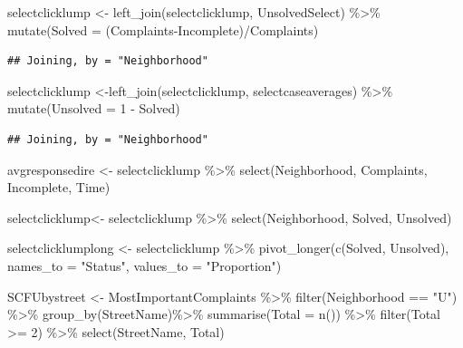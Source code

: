 \documentclass[
]{article}
\newenvironment{Shaded}{\begin{snugshade}}{\end{snugshade}}
\newcommand{\AttributeTok}[1]{\textcolor[rgb]{0.77,0.63,0.00}{#1}}
\newcommand{\DecValTok}[1]{\textcolor[rgb]{0.00,0.00,0.81}{#1}}
\newcommand{\FunctionTok}[1]{\textcolor[rgb]{0.00,0.00,0.00}{#1}}
\newcommand{\NormalTok}[1]{#1}
\newcommand{\OtherTok}[1]{\textcolor[rgb]{0.56,0.35,0.01}{#1}}
\newcommand{\SpecialCharTok}[1]{\textcolor[rgb]{0.00,0.00,0.00}{#1}}
\newcommand{\StringTok}[1]{\textcolor[rgb]{0.31,0.60,0.02}{#1}}
\begin{document}
\begin{Shaded}
\begin{Highlighting}[]
\NormalTok{selectclicklump }\OtherTok{\textless{}{-}} \FunctionTok{left\_join}\NormalTok{(selectclicklump, UnsolvedSelect) }\SpecialCharTok{\%\textgreater{}\%}
  \FunctionTok{mutate}\NormalTok{(}\AttributeTok{Solved =}\NormalTok{ (Complaints}\SpecialCharTok{{-}}\NormalTok{Incomplete)}\SpecialCharTok{/}\NormalTok{Complaints)}
\end{Highlighting}
\end{Shaded}

\begin{verbatim}
## Joining, by = "Neighborhood"
\end{verbatim}

\begin{Shaded}
\begin{Highlighting}[]
\NormalTok{ selectclicklump }\OtherTok{\textless{}{-}}\FunctionTok{left\_join}\NormalTok{(selectclicklump, selectcaseaverages) }\SpecialCharTok{\%\textgreater{}\%}
    \FunctionTok{mutate}\NormalTok{(}\AttributeTok{Unsolved =} \DecValTok{1} \SpecialCharTok{{-}}\NormalTok{ Solved) }
\end{Highlighting}
\end{Shaded}

\begin{verbatim}
## Joining, by = "Neighborhood"
\end{verbatim}

\begin{Shaded}
\begin{Highlighting}[]
\NormalTok{ avgresponsedire }\OtherTok{\textless{}{-}}\NormalTok{ selectclicklump }\SpecialCharTok{\%\textgreater{}\%}
  \FunctionTok{select}\NormalTok{(Neighborhood, Complaints, Incomplete, Time)}

\NormalTok{selectclicklump}\OtherTok{\textless{}{-}}\NormalTok{ selectclicklump }\SpecialCharTok{\%\textgreater{}\%}
  \FunctionTok{select}\NormalTok{(Neighborhood, Solved, Unsolved)}


\NormalTok{selectclicklumplong }\OtherTok{\textless{}{-}}\NormalTok{ selectclicklump }\SpecialCharTok{\%\textgreater{}\%}
  \FunctionTok{pivot\_longer}\NormalTok{(}\FunctionTok{c}\NormalTok{(Solved, Unsolved), }\AttributeTok{names\_to =} \StringTok{"Status"}\NormalTok{, }\AttributeTok{values\_to =} \StringTok{"Proportion"}\NormalTok{)}


  
\NormalTok{SCFUbystreet }\OtherTok{\textless{}{-}}\NormalTok{ MostImportantComplaints }\SpecialCharTok{\%\textgreater{}\%}
  \FunctionTok{filter}\NormalTok{(Neighborhood }\SpecialCharTok{==} \StringTok{"U"}\NormalTok{) }\SpecialCharTok{\%\textgreater{}\%}
  \FunctionTok{group\_by}\NormalTok{(StreetName)}\SpecialCharTok{\%\textgreater{}\%}
  \FunctionTok{summarise}\NormalTok{(}\AttributeTok{Total =} \FunctionTok{n}\NormalTok{()) }\SpecialCharTok{\%\textgreater{}\%}
  \FunctionTok{filter}\NormalTok{(Total }\SpecialCharTok{\textgreater{}=} \DecValTok{2}\NormalTok{) }\SpecialCharTok{\%\textgreater{}\%}
  \FunctionTok{select}\NormalTok{(StreetName, Total)}
\end{Highlighting}
\end{Shaded}
\end{document}

